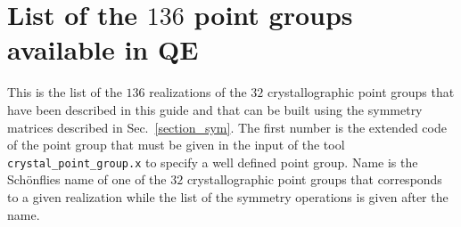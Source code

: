 \documentclass[12pt,a4paper,twoside]{report}
\begin{document}
{\color{dark-blue}\chapter{List of the $136$ point groups available in QE}}

This is the list of the $136$ realizations of the $32$ crystallographic 
point groups that have been described in this guide and that can be built 
using the symmetry matrices described in 
Sec.~\ref{section_sym}. The first number is
the extended code of the point group that must be given in the input 
of the tool \texttt{crystal\_point\_group.x} to specify a well
defined point group. Name is the Sch\"onflies name of one of the $32$
crystallographic point groups that corresponds to a given realization while
the list of the symmetry operations is given after the name.
\end{document}
